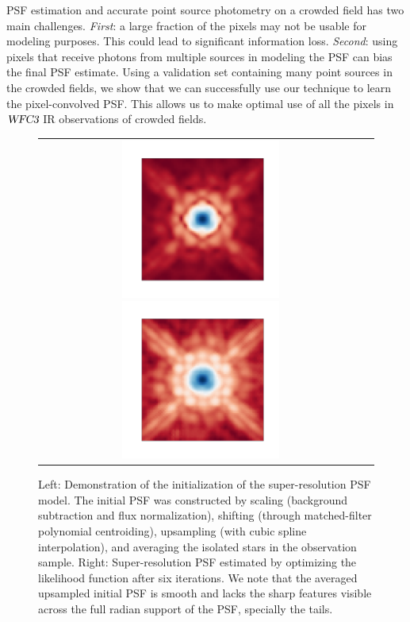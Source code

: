 PSF estimation and accurate point source photometry on a crowded field has two main challenges. \emph{First}: a large fraction of the pixels may not be usable for modeling purposes. This could lead to  significant information loss. \emph{Second}: using pixels that receive photons from multiple sources in modeling the PSF can bias the final PSF estimate. 
Using a validation set containing many point sources in the crowded fields, we show that we can successfully use our technique to learn the pixel-convolved PSF. 
This allows us to make optimal use of all the pixels in ${\textsl{WFC3}}$ IR observations of crowded fields.



\begin{figure}
 \begin{tabular}{cc}
\includegraphics[width=0.5\textwidth]{figures/wfc3ir/super0.png}
\includegraphics[width=0.5\textwidth]{figures/wfc3ir/super2.png}
\end{tabular}
\caption{\label{fig:srpsf} Left: Demonstration of the initialization of the super-resolution PSF model. The initial PSF was constructed by scaling (background subtraction and flux normalization), shifting (through matched-filter polynomial centroiding), upsampling (with cubic spline interpolation), and averaging the isolated stars in the observation sample. 
Right: Super-resolution PSF estimated by optimizing the likelihood function after six iterations. We note that the averaged upsampled initial PSF is smooth and lacks the sharp features visible across the full radian support of the PSF, specially the tails.}
\end{figure}


